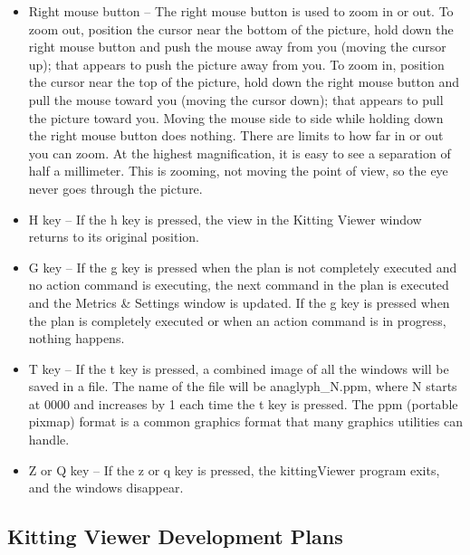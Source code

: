 \begin{itemize}
\item Right mouse button -- The right mouse button is used to zoom in or
  out. To zoom out, position the cursor near the bottom of the picture,
  hold down the right mouse button and push the mouse away from you (moving
  the cursor up); that appears to push the picture away from you. To zoom
  in, position the cursor near the top of the picture, hold down the right
  mouse button and pull the mouse toward you (moving the cursor down); that
  appears to pull the picture toward you. Moving the mouse side to side
  while holding down the right mouse button does nothing. There are limits
  to how far in or out you can zoom. At the highest magnification, it is
  easy to see a separation of half a millimeter. This is zooming, not
  moving the point of view, so the eye never goes through the picture.\\

\item H key -- If the h key is pressed, the view in the Kitting Viewer
  window returns to its original position.\\

\item G key -- If the g key is pressed when the plan is not completely
  executed and no action command is executing, the next command in the plan
  is executed and the Metrics \& Settings window is updated. If the g key
  is pressed when the plan is completely executed or when an action command
  is in progress, nothing happens.\\

\item T key -- If the t key is pressed, a combined image of all the windows
  will be saved in a file. The name of the file will be anaglyph\_N.ppm,
  where N starts at 0000 and increases by 1 each time the t key is
  pressed. The ppm (portable pixmap) format is a common graphics format
  that many graphics utilities can handle.\\

\item Z or Q key -- If the z or q key is pressed, the kittingViewer program
  exits, and the windows disappear.\\

\end{itemize}

\subsection{Kitting Viewer Development Plans}

